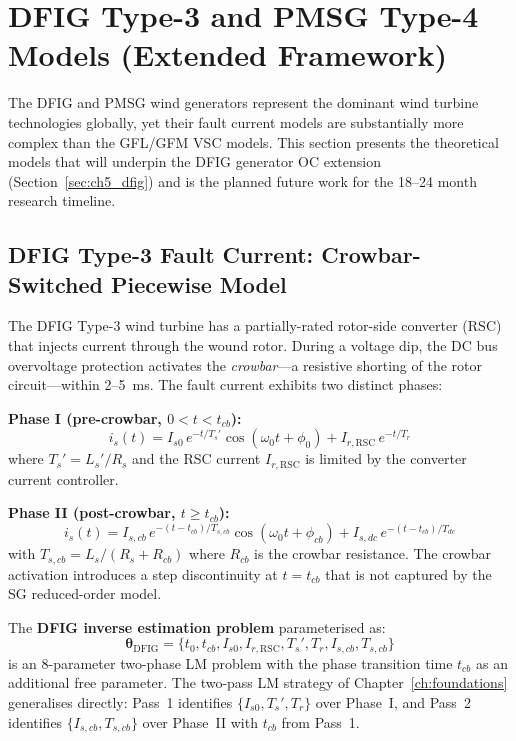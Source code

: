 \section{DFIG Type-3 and PMSG Type-4 Models (Extended Framework)}
\label{sec:ch3_dfig}

The DFIG and PMSG wind generators represent the dominant wind turbine
technologies globally, yet their fault current models are substantially
more complex than the GFL/GFM VSC models. This section presents the
theoretical models that will underpin the DFIG generator OC extension
(Section~\ref{sec:ch5_dfig}) and is the planned future work for the
18--24 month research timeline.

\subsection{DFIG Type-3 Fault Current: Crowbar-Switched Piecewise Model}

The DFIG Type-3 wind turbine has a partially-rated rotor-side converter
(RSC) that injects current through the wound rotor. During a voltage dip,
the DC bus overvoltage protection activates the \emph{crowbar}---a
resistive shorting of the rotor circuit---within 2--5~ms. The fault
current exhibits two distinct phases:

\textbf{Phase I (pre-crowbar, $0 < t < t_{cb}$):}
\begin{equation}
  i_s(t) = I_{s0}\,e^{-t/T_s'}\cos(\omega_0 t + \phi_0)
          + I_{r,\mathrm{RSC}}\,e^{-t/T_r}
  \label{eq:ch3_dfig_phase1}
\end{equation}
where $T_s' = L_s'/R_s$ and the RSC current $I_{r,\mathrm{RSC}}$ is
limited by the converter current controller.

\textbf{Phase II (post-crowbar, $t \geq t_{cb}$):}
\begin{equation}
  i_s(t) = I_{s,cb}\,e^{-(t-t_{cb})/T_{s,cb}}\cos(\omega_0 t + \phi_{cb})
          + I_{s,dc}\,e^{-(t-t_{cb})/T_{dc}}
  \label{eq:ch3_dfig_phase2}
\end{equation}
with $T_{s,cb} = L_s / (R_s + R_{cb})$ where $R_{cb}$ is the crowbar
resistance. The crowbar activation introduces a step discontinuity at
$t = t_{cb}$ that is not captured by the SG reduced-order model.

The \textbf{DFIG inverse estimation problem} parameterised as:
\begin{equation}
  \bm{\theta}_\mathrm{DFIG} = \{t_0, t_{cb}, I_{s0}, I_{r,\mathrm{RSC}},
    T_s', T_r, I_{s,cb}, T_{s,cb}\}
  \label{eq:ch3_dfig_params}
\end{equation}
is an 8-parameter two-phase LM problem with the phase transition time
$t_{cb}$ as an additional free parameter. The two-pass LM strategy of
Chapter~\ref{ch:foundations} generalises directly: Pass~1 identifies
$\{I_{s0}, T_s', T_r\}$ over Phase~I, and Pass~2 identifies
$\{I_{s,cb}, T_{s,cb}\}$ over Phase~II with $t_{cb}$ from Pass~1.

